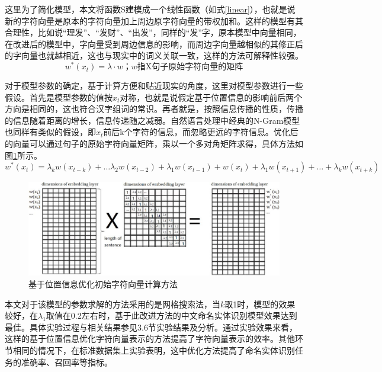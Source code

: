 \documentclass[winfonts,master,oneside,nobackinfo]{njuthesis}
\begin{document}
这里为了简化模型，本文将函数S建模成一个线性函数（如式\ref{linear}），也就是说新的字符向量是原本的字符向量加上周边原字符向量的带权加和。这样的模型有其合理性，比如说“理发”、“发财”、“出发”，同样的“发”字，原本模型中向量相同，在改进后的模型中，字向量受到周边信息的影响，而周边字向量越相似的其修正后的字向量也就越相近，这也与现实中的词义关联一致，这样的方法可解释性较强。
\begin{equation}
w^{*}\left(x_{t}\right)=\lambda \cdot w \mbox{；} w \mbox{指X句子原始字符向量的矩阵}
\label{linear}
\end{equation}

对于模型参数的确定，基于计算方便和贴近现实的角度，这里对模型参数进行一些假设。首先是模型参数的值按$x_{t}$对称，也就是说假定基于位置信息的影响前后两个方向是相同的，这也符合汉字组词的常识。再者就是，按照信息传播的性质，传播的信息随着距离的增长，信息传递随之减弱。自然语言处理中经典的N-Gram模型也同样有类似的假设，即$x_{t}$前后k个字符的信息，而忽略更远的字符信息。优化后的向量可以通过句子的原始字符向量矩阵，乘以一个多对角矩阵求得，具体方法如图\ref{modify-site}所示。
\begin{equation}
w^{*}\left(x_{t}\right)=\lambda_{k} w\left(x_{t-k}\right)+\ldots \lambda_{2}w\left(x_{t-2}\right)+\lambda_{1} w\left(x_{t-1}\right)+ w\left(x_{t}\right)+\lambda_{1} w\left(x_{t+1}\right)+\ldots+\lambda_{k} w\left(x_{t+k}\right)
\end{equation}
\begin{figure}[h]
\centering
\includegraphics[width=1.04\textwidth]{./figure/基于位置信息变化.jpg}
\caption{基于位置信息优化初始字符向量计算方法}
\label{modify-site}
\end{figure}

本文对于该模型的参数求解的方法采用的是网格搜索法，当$k$取1时，模型的效果较好，在$\lambda_{1}$取值在0.2左右时，基于此改进方法的中文命名实体识别模型效果达到最佳。具体实验过程与相关结果参见3.6节实验结果及分析。通过实验效果来看，这样的基于位置信息优化字符向量表示的方法提高了字符向量表示的效率。其他环节相同的情况下，在标准数据集上实验表明，这中优化方法提高了命名实体识别任务的准确率、召回率等指标。
\end{document}
